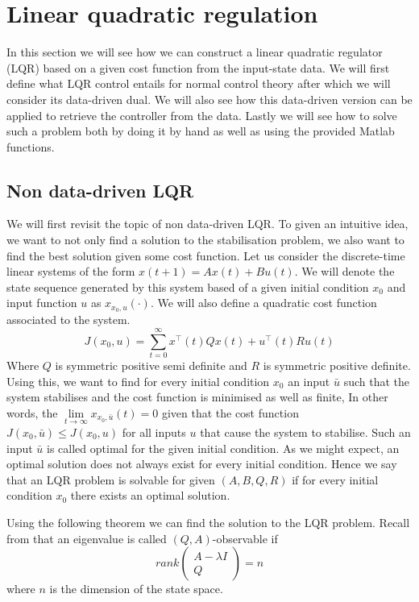 \section{Linear quadratic regulation}
In this section we will see how we can construct a linear quadratic regulator (LQR) based on a given cost function from the input-state data. We will first define what LQR control entails for normal control theory after which we will consider its data-driven dual. We will also see how this data-driven version can be applied to retrieve the controller from the data. Lastly we will see how to solve such a problem both by doing it by hand as well as using the provided Matlab functions.

\subsection{Non data-driven LQR}
We will first revisit the topic of non data-driven LQR. To given an intuitive idea, we want to not only find a solution to the stabilisation problem, we also want to find the best solution given some cost function. Let us consider the discrete-time linear systems of the form $x(t+1) = Ax(t) + Bu(t)$. We will denote the state sequence generated by this system based of a given initial condition $x_0$ and input function $u$ as $x_{x_0 , u}(\cdot)$. We will also define a quadratic cost function associated to the system.
\begin{equation*}
J(x_0 , u) = \sum_{t=0}^{\infty} x^\top (t) Q x (t) + u^\top (t) R u (t)
\end{equation*}
Where $Q$ is symmetric positive semi definite and $R$ is symmetric positive definite. Using this, we want to find for every initial condition $x_0$ an input $\bar{u}$ such that the system stabilises and the cost function is minimised as well as finite, In other words, the $\lim\limits_{t \to \infty} x_{x_0 , \bar{u}}(t) = 0$ given that the cost function $J(x_0 , \bar{u}) \leq J(x_0 , u)$ for all inputs $u$ that cause the system to stabilise. Such an input $\bar{u}$ is called optimal for the given initial condition. As we might expect, an optimal solution does not always exist for every initial condition. Hence we say that an LQR problem is solvable for given $(A,B,Q,R)$ if for every initial condition $x_0$ there exists an optimal solution.

Using the following theorem we can find the solution to the LQR problem. Recall from \cite[Def 3.12]{bookTrentelman} that an eigenvalue is called $(Q,A)$-observable if 
$$rank\begin{pmatrix}A - \lambda I \\ Q \end{pmatrix} = n$$
where $n$ is the dimension of the state space.

